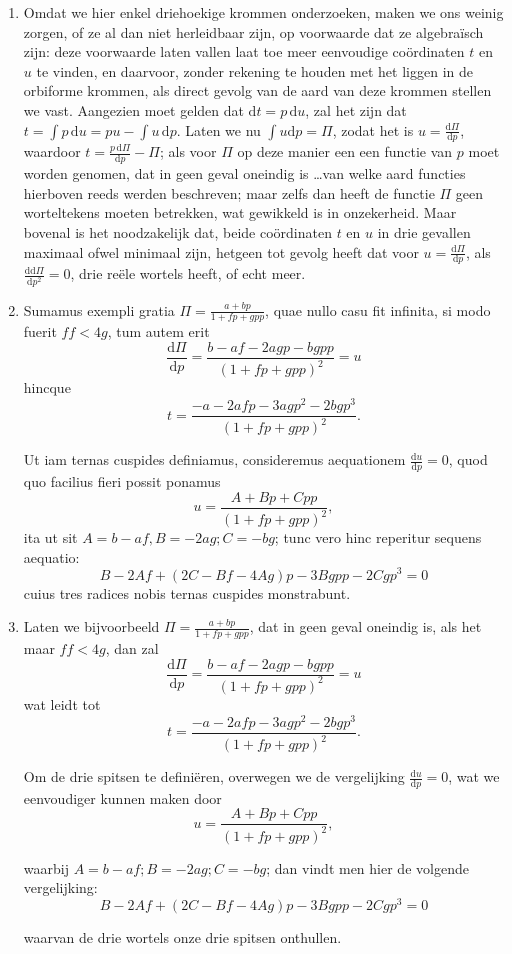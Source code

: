 \documentclass[10pt,a4paper]{article}
\newcommand{\switchenum}{\setcounter{enumi}{\arabic{enumi}-1}\switchcolumn}
\def\D{\mathrm{d}}
\begin{document}
\begin{paracol}{2}
\begin{enumerate}[topsep=1px]
		\switchenum
		\item Omdat we hier enkel driehoekige krommen onderzoeken, maken we ons weinig zorgen, of ze al dan niet herleidbaar zijn, op voorwaarde dat ze algebraïsch zijn: deze voorwaarde laten vallen laat toe meer eenvoudige coördinaten $t$ en $u$ te vinden, en daarvoor, zonder rekening te houden met het liggen in de orbiforme krommen, als direct gevolg van de aard van deze krommen stellen we vast. Aangezien moet gelden dat $\D t = p\, \D u$, zal het zijn dat $t=\int p \, \D u= pu-\int u \, \D p$. Laten we nu $\int u \D p = \Pi$, zodat het is $u = \frac{\D \Pi}{\D p}$, waardoor $t=\frac{p\,\D \Pi}{\D p}-\Pi$; als voor $\Pi$ op deze manier een een functie van $p$ moet worden genomen, dat in geen geval oneindig is \ldots van welke aard functies hierboven reeds werden beschreven; maar zelfs dan heeft de functie $\Pi$ geen worteltekens moeten betrekken, wat gewikkeld is in onzekerheid. Maar bovenal is het noodzakelijk dat, beide coördinaten $t$ en $u$ in drie gevallen maximaal ofwel minimaal zijn, hetgeen tot gevolg heeft dat voor $u=\frac{\D \Pi }{\D p}$, als $\frac{\D \D \Pi}{\D p^2}=0$, drie reële wortels heeft, of echt meer.
		\switchcolumn*
		
		\item Sumamus exempli gratia $\Pi = \frac{a+bp}{1+fp+gpp}$, quae nullo casu fit infinita, si modo fuerit $ff< 4g$, tum autem erit
		\[
			\frac{\D \Pi}{\D p} = \frac{b-af-2agp-bgpp}{(1+fp+gpp)^2} = u
		\]
		hincque
		\[
			t = \frac{-a-2afp-3agp^2-2bgp^3}{(1+fp+gpp)^2}.
		\]
		\par Ut iam ternas cuspides definiamus, consideremus aequationem $\frac{\D u}{\D p} = 0$, quod quo facilius fieri possit ponamus
		\[
			u  =  \frac{A+Bp+Cpp}{(1+fp+gpp)^2},
		\]
		ita ut sit $A=b-af, B=-2ag; C=-bg$; tunc vero hinc reperitur sequens aequatio:
		\[
			B-2Af+(2C-Bf-4Ag)p-3Bgpp-2Cgp^3 = 0
		\]
		cuius tres radices nobis ternas cuspides monstrabunt.
		
		\switchenum
		\item Laten we bijvoorbeeld $\Pi = \frac{a+bp}{1+fp+gpp}$, dat in geen geval oneindig is, als het maar $ff< 4g$, dan zal
		\[
			\frac{\D \Pi}{\D p} = \frac{b-af-2agp-bgpp}{(1+fp+gpp)^2} = u
		\]
		wat leidt tot
		\[
			t = \frac{-a-2afp-3agp^2-2bgp^3}{(1+fp+gpp)^2}.
		\]
		\par Om de drie spitsen te definiëren, 	overwegen we de vergelijking $\frac{\D u}{\D p}=0$, wat we eenvoudiger kunnen maken door 
		\[
			u  =  \frac{A+Bp+Cpp}{(1+fp+gpp)^2},
		\]
		\par waarbij $A=b-af; B= -2ag; C=-bg$; dan vindt men hier de volgende vergelijking:
		\[
			B-2Af+(2C-Bf-4Ag)p-3Bgpp-2Cgp^3 = 0
		\]
		\par waarvan de drie wortels onze drie spitsen onthullen.
		

\end{enumerate}
\end{paracol}
\end{document}
